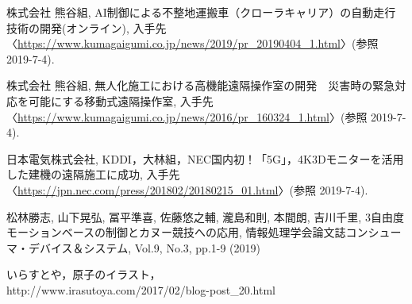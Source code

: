 \documentclass[10pt,a4paper]{jsarticle}
\begin{document}
\begin{flushleft} %
\begin{thebibliography}{9} %

株式会社 熊谷組, AI制御による不整地運搬車（クローラキャリア）の自動走行技術の開発(オンライン), 入手先〈\url{https://www.kumagaigumi.co.jp/news/2019/pr_20190404_1.html}〉(参照 2019-7-4).


株式会社 熊谷組, 無人化施工における高機能遠隔操作室の開発　災害時の緊急対応を可能にする移動式遠隔操作室, 入手先〈\url{https://www.kumagaigumi.co.jp/news/2016/pr_160324_1.html}〉(参照 2019-7-4).


日本電気株式会社, KDDI，大林組，NEC国内初！「5G」，4K3Dモニターを活用した建機の遠隔施工に成功, 入手先〈\url{https://jpn.nec.com/press/201802/20180215_01.html}〉(参照 2019-7-4).

松林勝志, 山下晃弘, 冨平準喜, 佐藤悠之輔, 瀧島和則, 本間朗, 吉川千里, 3自由度モーションベースの制御とカヌー競技への応用, 情報処理学会論文誌コンシューマ・デバイス＆システム, Vol.9, No.3, pp.1-9 (2019)

いらすとや，原子のイラスト，
\\ %
http://www.irasutoya.com/2017/02/blog-post\_20.html %

\end{thebibliography}
\end{flushleft}
\end{document}
